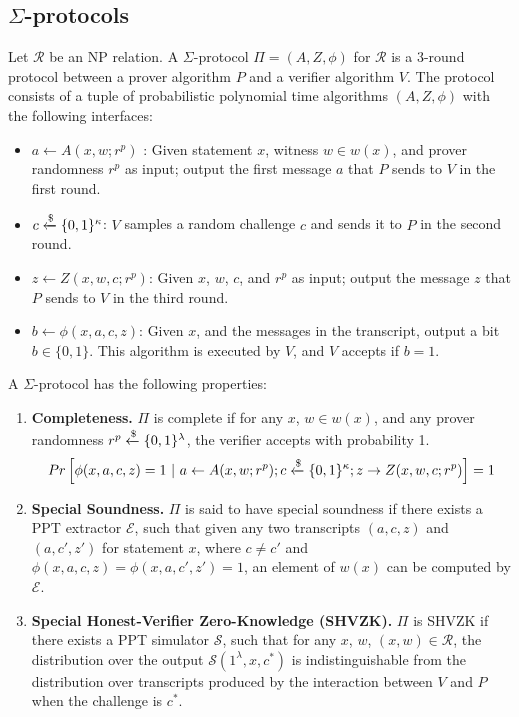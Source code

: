 \subsection{$\Sigma$-protocols}
\begin{definition}
Let $\mathcal R$ be an NP relation. A $\Sigma$-protocol $\Pi = (A, Z, \phi)$ for $\mathcal R$ is a 3-round protocol between a prover algorithm $P$ and a verifier algorithm $V$. The protocol consists of a tuple of probabilistic polynomial time algorithms $(A, Z, \phi)$ with the following interfaces:
\begin{itemize}
    \item $a \leftarrow A(x,w; r^p)$ : Given statement $x$, witness $w \in w(x)$, and prover randomness $r^p$ as input; output the first message $a$ that $P$ sends to $V$ in the first round. 
    \item $c \xleftarrow{\$} \{0,1\}^\kappa$: $V$ samples a random challenge $c$ and sends it to $P$ in the second round. 
    \item $z \leftarrow Z(x,w,c; r^p)$: Given $x$, $w$, $c$, and $r^p$ as input; output the message $z$ that $P$ sends to $V$ in the third round.
    \item $b \leftarrow \phi(x,a,c,z)$: Given $x$, and the messages in the transcript, output a bit $b \in \{0,1\}$. This algorithm is executed by $V$, and $V$ accepts if $b = 1$.
\end{itemize}
A $\Sigma$-protocol has the following properties:
\begin{enumerate}
    \item \textbf{Completeness.} $\Pi$ is complete if for any $x$, $w \in w(x)$, and any prover randomness $r^p \xleftarrow{\$} \{0,1\}^\lambda$, the verifier accepts with probability 1. 
    \begin{gather*}
        Pr\left[\phi(x,a,c,z) = 1 \ \vert\  a \leftarrow A(x,w;r^p); c\xleftarrow{\$} \{0,1\}^\kappa; z \rightarrow Z(x,w,c;r^p)\right] = 1
    \end{gather*}
    \item \textbf{Special Soundness.} $\Pi$ is said to have special soundness if  there exists a PPT extractor $\mathcal E$, such that given any two transcripts $(a,c,z)$ and $(a,c',z')$ for statement $x$, where $c \ne c'$ and $\phi(x,a,c,z) = \phi(x,a,c',z') = 1$, an element of $w(x)$ can be computed by $\mathcal E$.
    \item \textbf{Special Honest-Verifier Zero-Knowledge (SHVZK).} $\Pi$ is SHVZK if there exists a PPT simulator $\mathcal S$, such that for any $x$, $w$, $(x,w) \in \mathcal R$, the distribution over the output $\mathcal S(1^\lambda, x, c^*)$ is indistinguishable from the distribution over transcripts produced by the interaction between $V$ and $P$ when the challenge is $c^*$.

\end{enumerate}
\end{definition}
